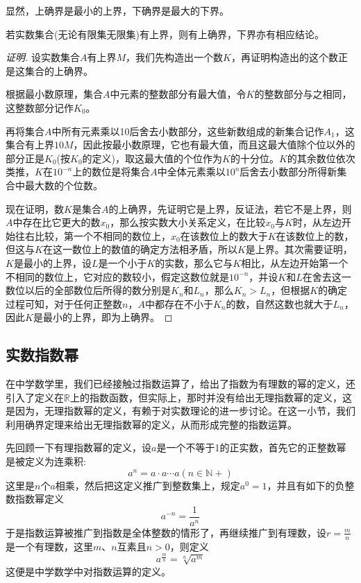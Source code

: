 显然，上确界是最小的上界，下确界是最大的下界。

\begin{theorem}[确界定理]
若实数集合(无论有限集无限集)有上界，则有上确界，下界亦有相应结论。
\end{theorem}

\begin{proof}[证明]
设实数集合$A$有上界$M$，我们先构造出一个数$K$，再证明构造出的这个数正是这集合的上确界。

根据最小数原理，集合$A$中元素的整数部分有最大值，令$K$的整数部分与之相同，这整数部分记作$K_0$。

再将集合$A$中所有元素乘以10后舍去小数部分，这些新数组成的新集合记作$A_1$，这集合有上界$10M$，因此按最小数原理，它也有最大值，而且这最大值除个位以外的部分正是$K_0$(按$K_0$的定义)，取这最大值的个位作为$K$的十分位。$K$的其余数位依次类推，$K$在$10^{-n}$上的数位是将集合$A$中全体元素乘以$10^n$后舍去小数部分所得新集合中最大数的个位数。

现在证明，数$K$是集合$A$的上确界，先证明它是上界，反证法，若它不是上界，则$A$中存在比它更大的数$x_0$，那么按实数大小关系定义，在比较$x_0$与$K$时，从左边开始往右比较，第一个不相同的数位上，$x_0$在该数位上的数大于$K$在该数位上的数，但这与$K$在这一数位上的数值的确定方法相矛盾，所以$K$是上界。其次需要证明，$K$是最小的上界，设$L$是一个小于$K$的实数，那么它与$K$相比，从左边开始第一个不相同的数位上，它对应的数较小，假定这数位就是$10^{-n}$，并设$K$和$L$在舍去这一数位以后的全部数位后所得的数分别是$K_n$和$L_n$，那么$K_n>L_n$，但根据$K$的确定过程可知，对于任何正整数$n$，$A$中都存在不小于$K_n$的数，自然这数也就大于$L_n$，因此$K$是最小的上界，即为上确界。
\end{proof}

\subsection{实数指数幂}
\label{sec:real-exponential-power}

在中学数学里，我们已经接触过指数运算了，给出了指数为有理数的幂的定义，还引入了定义在$\mathbb{R}$上的指数函数，但实际上，那时并没有给出无理指数幂的定义，这是因为，无理指数幂的定义，有赖于对实数理论的进一步讨论。在这一小节，我们利用确界定理来给出无理指数幂的定义，从而形成完整的指数运算。

先回顾一下有理指数幂的定义，设$a$是一个不等于1的正实数，首先它的正整数幂是被定义为连乘积:
\[ a^n = a \cdot a \cdots a (n \in \mathbb{N+}) \]
这里是$n$个$a$相乘，然后把这定义推广到整数集上，规定$a^0=1$，并且有如下的负整数指数幂定义
\[ a^{-n}=\frac{1}{a^n} \]
于是指数运算被推广到指数是全体整数的情形了，再继续推广到有理数，设$r=\frac{m}{n}$是一个有理数，这里$m$、$n$互素且$n>0$，则定义
\[ a^{\frac{m}{n}} = \sqrt[n]{a^m} \]
这便是中学数学中对指数运算的定义。

